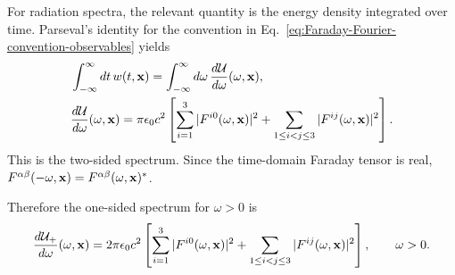 For radiation spectra, the relevant quantity is the energy density integrated
over time.  Parseval's identity for the convention in
Eq.~\eqref{eq:Faraday-Fourier-convention-observables} yields
\begin{align}
  &\int_{-\infty}^{\infty}dt\,w(t,{\bf x})
  =\int_{-\infty}^{\infty}d\omega\,
  \frac{d\mathcal U}{d\omega}(\omega,{\bf x}),\\
  &\frac{d\mathcal U}{d\omega}(\omega,{\bf x})
  =\pi\epsilon_0c^2
  \left[
    \sum_{i=1}^{3}|F^{i0}(\omega,{\bf x})|^2
    +\sum_{1\leq i<j\leq3}|F^{ij}(\omega,{\bf x})|^2
  \right].
  \label{eq:two-sided-spectral-energy-density-F}
\end{align}
This is the two-sided spectrum.  Since the time-domain Faraday tensor is
real, $F^{\alpha\beta}(-\omega,{\bf x})=
F^{\alpha\beta}(\omega,{\bf x})^*$.
\begin{highlightbox}[title={One-sided spectral energy density}]
  Therefore the one-sided spectrum for
  $\omega>0$ is
  \begin{align}
    \frac{d\mathcal U_+}{d\omega}(\omega,{\bf x})
    =2\pi\epsilon_0c^2
    \left[
      \sum_{i=1}^{3}|F^{i0}(\omega,{\bf x})|^2
      +\sum_{1\leq i<j\leq3}|F^{ij}(\omega,{\bf x})|^2
    \right],\qquad \omega>0.
    \label{eq:one-sided-spectral-energy-density-F}
  \end{align}

\end{highlightbox}

